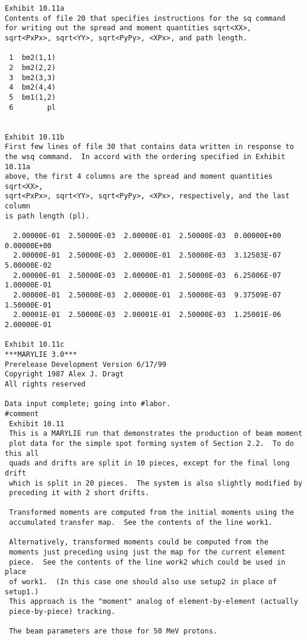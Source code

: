 \newpage
\begin{footnotesize}
\begin{verbatim}
Exhibit 10.11a
Contents of file 20 that specifies instructions for the sq command
for writing out the spread and moment quantities sqrt<XX>,
sqrt<PxPx>, sqrt<YY>, sqrt<PyPy>, <XPx>, and path length.

 1  bm2(1,1)
 2  bm2(2,2)
 3  bm2(3,3)
 4  bm2(4,4)
 5  bm1(1,2)
 6        pl


Exhibit 10.11b
First few lines of file 30 that contains data written in response to
the wsq command.  In accord with the ordering specified in Exhibit 10.11a
above, the first 4 columns are the spread and moment quantities sqrt<XX>,
sqrt<PxPx>, sqrt<YY>, sqrt<PyPy>, <XPx>, respectively, and the last column
is path length (pl).

  2.00000E-01  2.50000E-03  2.00000E-01  2.50000E-03  0.00000E+00  0.00000E+00
  2.00000E-01  2.50000E-03  2.00000E-01  2.50000E-03  3.12503E-07  5.00000E-02
  2.00000E-01  2.50000E-03  2.00000E-01  2.50000E-03  6.25006E-07  1.00000E-01
  2.00000E-01  2.50000E-03  2.00000E-01  2.50000E-03  9.37509E-07  1.50000E-01
  2.00001E-01  2.50000E-03  2.00001E-01  2.50000E-03  1.25001E-06  2.00000E-01

Exhibit 10.11c
***MARYLIE 3.0***
Prerelease Development Version 6/17/99
Copyright 1987 Alex J. Dragt
All rights reserved

Data input complete; going into #labor.
#comment
 Exhibit 10.11
 This is a MARYLIE run that demonstrates the production of beam moment
 plot data for the simple spot forming system of Section 2.2.  To do this all
 quads and drifts are split in 10 pieces, except for the final long drift
 which is split in 20 pieces.  The system is also slightly modified by
 preceding it with 2 short drifts.

 Transformed moments are computed from the initial moments using the
 accumulated transfer map.  See the contents of the line work1.

 Alternatively, transformed moments could be computed from the
 moments just preceding using just the map for the current element
 piece.  See the contents of the line work2 which could be used in place
 of work1.  (In this case one should also use setup2 in place of setup1.)
 This approach is the "moment" analog of element-by-element (actually
 piece-by-piece) tracking.

 The beam parameters are those for 50 MeV protons.


\end{verbatim}
\end{footnotesize}
